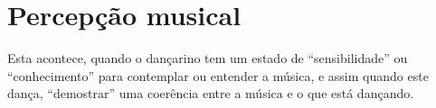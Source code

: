 


\chapter{Percepção musical}
\label{cap:percepcaomusical}

\begin{definition} 
\label{def:PercepcaoMusical}
Esta acontece, quando o dançarino tem um estado de ``sensibilidade'' ou ``conhecimento'' para contemplar ou entender a música,
e assim quando este dança, ``demostrar'' uma coerência entre a música e o que está dançando.
\end{definition}








